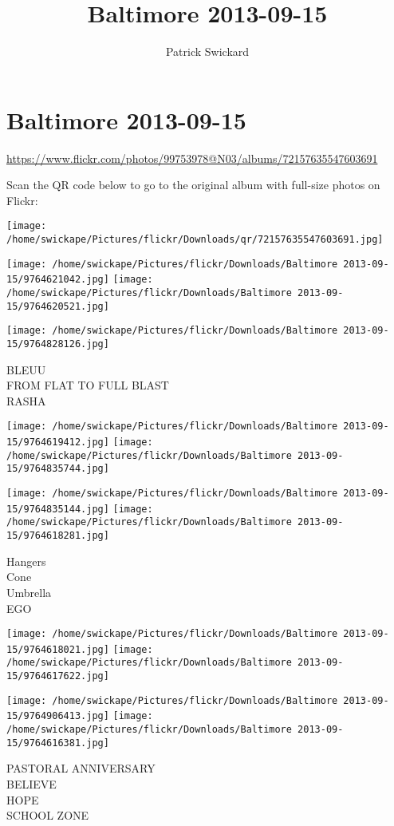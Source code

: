 \documentclass[10pt,letterpaper]{article}
\title{Baltimore 2013-09-15}
\author{Patrick Swickard}
\date{}
\begin{document}
\section*{Baltimore 2013-09-15}

\url{https://www.flickr.com/photos/99753978@N03/albums/72157635547603691}

Scan the QR code below to go to the original album with full-size photos on Flickr:

\texttt{[image: /home/swickape/Pictures/flickr/Downloads/qr/72157635547603691.jpg]}
\pagebreak

\texttt{[image: /home/swickape/Pictures/flickr/Downloads/Baltimore 2013-09-15/9764621042.jpg]}
\texttt{[image: /home/swickape/Pictures/flickr/Downloads/Baltimore 2013-09-15/9764620521.jpg]}

\vspace{0.25in}
\texttt{[image: /home/swickape/Pictures/flickr/Downloads/Baltimore 2013-09-15/9764828126.jpg]}

BLEUU\\
FROM FLAT TO FULL BLAST\\
RASHA
\pagebreak

\texttt{[image: /home/swickape/Pictures/flickr/Downloads/Baltimore 2013-09-15/9764619412.jpg]}
\texttt{[image: /home/swickape/Pictures/flickr/Downloads/Baltimore 2013-09-15/9764835744.jpg]}

\texttt{[image: /home/swickape/Pictures/flickr/Downloads/Baltimore 2013-09-15/9764835144.jpg]}
\texttt{[image: /home/swickape/Pictures/flickr/Downloads/Baltimore 2013-09-15/9764618281.jpg]}

Hangers\\
Cone\\
Umbrella\\
EGO
\pagebreak

\texttt{[image: /home/swickape/Pictures/flickr/Downloads/Baltimore 2013-09-15/9764618021.jpg]}
\texttt{[image: /home/swickape/Pictures/flickr/Downloads/Baltimore 2013-09-15/9764617622.jpg]}

\texttt{[image: /home/swickape/Pictures/flickr/Downloads/Baltimore 2013-09-15/9764906413.jpg]}
\texttt{[image: /home/swickape/Pictures/flickr/Downloads/Baltimore 2013-09-15/9764616381.jpg]}

PASTORAL ANNIVERSARY\\
BELIEVE\\
HOPE\\
SCHOOL ZONE
\pagebreak
\end{document}
